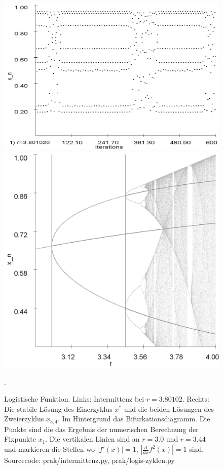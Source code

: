 \documentclass[11,5pt, twoside]{article}
\begin{document}
\begin{figure}[!htbp]
\centering
\includegraphics[scale=0.22]{intermittenz}
\includegraphics[scale=0.15]{analy-periodenv}
\caption{Logistische Funktion. Links: Intermittenz bei $r=3.80102$. Rechts: Die stabile Lösung des Einerzyklus $x^*$ und die beiden Lösungen des Zweierzyklus $x_{3,4}$. Im Hintergrund das Bifurkationsdiagramm. Die Punkte sind die das Ergebnis der numerischen Berechnung der Fixpunkte $x_1$. Die vertikalen Linien sind an $r=3.0$ und $r=3.44$ und markieren die Stellen wo $|f'(x)|=1$, $|\frac{d}{dx}f^2(x)|=1$ sind. Sourcecode: prak/intermittenz.py, prak/logis-zyklen.py}. 
\label{fig:log-intermittenz-cycles}
\end{figure}
\end{document}
